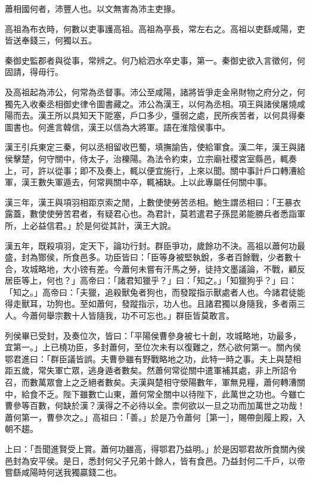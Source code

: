 
\begin{pinyinscope}
蕭相國何者，沛豐人也。以文無害為沛主吏掾。

高祖為布衣時，何數以吏事護高祖。高祖為亭長，常左右之。高祖以吏繇咸陽，吏皆送奉錢三，何獨以五。

秦御史監郡者與從事，常辨之。何乃給泗水卒史事，第一。秦御史欲入言徵何，何固請，得毋行。

及高祖起為沛公，何常為丞督事。沛公至咸陽，諸將皆爭走金帛財物之府分之，何獨先入收秦丞相御史律令圖書藏之。沛公為漢王，以何為丞相。項王與諸侯屠燒咸陽而去。漢王所以具知天下阸塞，戶口多少，彊弱之處，民所疾苦者，以何具得秦圖書也。何進言韓信，漢王以信為大將軍。語在淮陰侯事中。

漢王引兵東定三秦，何以丞相留收巴蜀，填撫諭告，使給軍食。漢二年，漢王與諸侯擊楚，何守關中，侍太子，治櫟陽。為法令約束，立宗廟社稷宮室縣邑，輒奏上，可，許以從事；即不及奏上，輒以便宜施行，上來以聞。關中事計戶口轉漕給軍，漢王數失軍遁去，何常興關中卒，輒補缺。上以此專屬任何關中事。

漢三年，漢王與項羽相距京索之閒，上數使使勞苦丞相。鮑生謂丞相曰：「王暴衣露蓋，數使使勞苦君者，有疑君心也。為君計，莫若遣君子孫昆弟能勝兵者悉詣軍所，上必益信君。」於是何從其計，漢王大說。

漢五年，既殺項羽，定天下，論功行封。群臣爭功，歲餘功不決。高祖以蕭何功最盛，封為酂侯，所食邑多。功臣皆曰：「臣等身被堅執銳，多者百餘戰，少者數十合，攻城略地，大小镑有差。今蕭何未嘗有汗馬之勞，徒持文墨議論，不戰，顧反居臣等上，何也？」高帝曰：「諸君知獵乎？」曰：「知之。」「知獵狗乎？」曰：「知之。」高帝曰：「夫獵，追殺獸兔者狗也，而發蹤指示獸處者人也。今諸君徒能得走獸耳，功狗也。至如蕭何，發蹤指示，功人也。且諸君獨以身隨我，多者兩三人。今蕭何舉宗數十人皆隨我，功不可忘也。」群臣皆莫敢言。

列侯畢已受封，及奏位次，皆曰：「平陽侯曹參身被七十創，攻城略地，功最多，宜第一。」上已橈功臣，多封蕭何，至位次未有以復難之，然心欲何第一。關內侯鄂君進曰：「群臣議皆誤。夫曹參雖有野戰略地之功，此特一時之事。夫上與楚相距五歲，常失軍亡眾，逃身遁者數矣。然蕭何常從關中遣軍補其處，非上所詔令召，而數萬眾會上之乏絕者數矣。夫漢與楚相守滎陽數年，軍無見糧，蕭何轉漕關中，給食不乏。陛下雖數亡山東，蕭何常全關中以待陛下，此萬世之功也。今雖亡曹參等百數，何缺於漢？漢得之不必待以全。柰何欲以一旦之功而加萬世之功哉！蕭何第一，曹參次之。」高祖曰：「善。」於是乃令蕭何［第一］，賜帶劍履上殿，入朝不趨。

上曰：「吾聞進賢受上賞。蕭何功雖高，得鄂君乃益明。」於是因鄂君故所食關內侯邑封為安平侯。是日，悉封何父子兄弟十餘人，皆有食邑。乃益封何二千戶，以帝嘗繇咸陽時何送我獨贏錢二也。


\end{pinyinscope}
